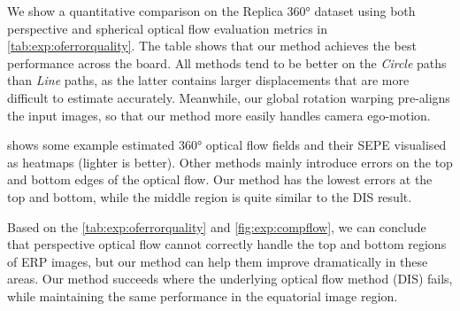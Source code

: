 We show a quantitative comparison on the Replica 360° dataset using both perspective and spherical optical flow evaluation metrics in \cref{tab:exp:oferrorquality}.
%
The table
shows that our method achieves the best performance across the board.
%
All methods tend to be better on the \emph{Circle} paths than \emph{Line} paths, as the latter contains larger displacements that are more difficult to estimate accurately.
%
Meanwhile, our global rotation warping pre-aligns the input images, so that our method more easily handles camera ego-motion.


 shows some example estimated 360° optical flow fields and their SEPE visualised as heatmaps (lighter is better).
Other methods mainly introduce errors on the top and bottom edges of the optical flow.
Our method has the lowest errors at the top and bottom, while the middle region is quite similar to the DIS result.


Based on the \cref{tab:exp:oferrorquality} and \cref{fig:exp:compflow}, we can conclude that
%
perspective optical flow cannot correctly handle the top and bottom regions of ERP images, but our method can help them improve dramatically in these areas.
%
Our method succeeds where the underlying optical flow method (DIS) fails, while maintaining the same performance in the equatorial image region.



